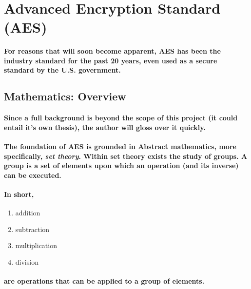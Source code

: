 \section{Advanced Encryption Standard (AES)}

\paragraph{For reasons that will soon become apparent, AES has been the industry standard for the past 20 years, even used as a secure standard by the U.S. government.}\cite{Aumasson}


\subsection{Mathematics: Overview}
\paragraph{Since a full background is beyond the scope of this project (it could entail it's own thesis), the author will gloss over it quickly.}

\paragraph{The foundation of AES is grounded in Abstract mathematics, more specifically, \emph{set theory}. Within set theory exists the study of groups. A group is a set of elements upon which an operation (and its inverse) can be executed.}\cite[p. 92]{PaarPelzl} 

\paragraph{In short,}

\begin{enumerate}
\item addition
\item subtraction
\item multiplication
\item division
\end{enumerate}

\paragraph{are operations that can be applied to a group of elements.}

